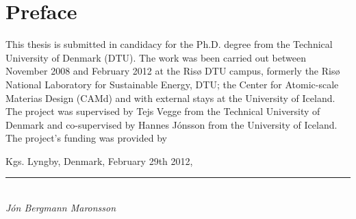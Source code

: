 \section*{Preface}

This thesis is submitted in candidacy for the Ph.D. degree from the Technical University of Denmark (DTU).
The work was been carried out between November 2008 and February 2012 at the Ris\o{} DTU campus, formerly the Ris\o{} National Laboratory for Sustainable Energy, DTU; the Center for Atomic-scale Materias Design (CAMd) and with external stays at the University of Iceland.
The project was supervised by Tejs Vegge from the Technical University of Denmark and co-supervised by Hannes J\'onsson from the University of Iceland.
The project's funding was provided by \expand

\placeholder
\begin{comment}
At the end of my Ph.D. project, I would like to express my thanks many people.

First of all are my supervisors, Tejs Vegge and Hannes J\'onsson.
Tejs' ever positive attitude, always seeing the positive side in all situations served as an incredible inspiration to me both with regards to the project and life in general.
Every meeting of ours would leave me in a better place.
Hannes' involvement was essential to the project.
He is such a fountain of knowledge with regards to all aspects of my project.
I enjoyed our discussion of the sciences tremendously.

Then come my co-workers at DTU and Ris\o{} who are literally too many to appropriately thank each one.
The memers of Tejs Vegge's group who have come and gone.
My office buddies at DTU.

My trusty team of proofreaders and fellow group members warrant special thanks: Jakob Howalt, Steen Lysgaard, J\'on Steinar Gar\dh{}arsson M\'yrdal and Peter Jensen. Cake will be served.

Special thanks go to my lunch buddy and right-hand man Elvar \"Orn J\'onsson and his posse of Icelanders.

My friends, parents, grandparents and seemingly endless amount of siblings have a special place in my heart for tolerating long bouts of my stays abroad.

And finally my main buddy in chemistry (studies and that of the heart), Ester, I love you!
\end{comment}

\vspace{10mm}
\begin{flushright}
Kgs. Lyngby, Denmark, February 29th 2012,\\

\vspace{15mm}

\rule{50mm}{0.1pt}\\
\textit{J\'on Bergmann Maronsson}
\end{flushright}
